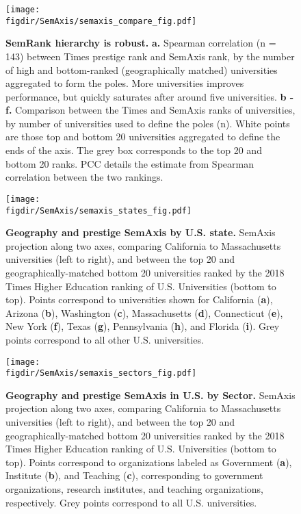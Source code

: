 \documentclass[12pt]{article} %
\def\figdir{../Figs}
\begin{document}
%
%
\begin{figure}[hp!]
	\centering
	\label{fig:supp:semaxis_compare}
	\texttt{[image: \\figdir/SemAxis/semaxis\_compare\_fig.pdf]}
	\caption{
		\textbf{SemRank hierarchy is robust.}
		\textbf{a.} Spearman correlation (n = 143) between Times prestige rank and SemAxis rank, by the number of high and bottom-ranked (geographically matched) universities aggregated to form the poles. 
		More universities improves performance, but quickly saturates after around five universities. 
		\textbf{b - f.} Comparison between the Times and SemAxis ranks of universities, by number of universities used to define the poles (n). 
		White points are those top and bottom 20 universities aggregated to define the ends of the axis. 
		The grey box corresponds to the top 20 and bottom 20 ranks. 
	  	PCC details the estimate from Spearman correlation between the two rankings. 
	}
\end{figure}


%
%
\begin{figure}[hp!]
	\centering
	\label{fig:supp:semaxis_states}
	\texttt{[image: \\figdir/SemAxis/semaxis\_states\_fig.pdf]}
	\caption{
		\textbf{Geography and prestige SemAxis by U.S. state.}
		SemAxis projection along two axes, comparing California to Massachusetts universities (left to right), and between the top 20 and geographically-matched bottom 20 universities ranked by the 2018 Times Higher Education ranking of U.S. Universities (bottom to top). 
		Points correspond to universities shown for California (\textbf{a}), Arizona (\textbf{b}), Washington (\textbf{c}), Massachusetts (\textbf{d}), Connecticut (\textbf{e}), New York (\textbf{f}), Texas (\textbf{g}), Pennsylvania (\textbf{h}), and Florida (\textbf{i}).
		Grey points correspond to all other U.S. universities. 
	}
\end{figure}


%
%
\begin{figure}[hp!]
	\centering
	\label{fig:supp:semaxis_sectors}
	\texttt{[image: \\figdir/SemAxis/semaxis\_sectors\_fig.pdf]}
	\caption{
		\textbf{Geography and prestige SemAxis in U.S. by Sector.}
		SemAxis projection along two axes, comparing California to Massachusetts universities (left to right), and between the top 20 and geographically-matched bottom 20 universities ranked by the 2018 Times Higher Education ranking of U.S. Universities (bottom to top). 
		Points correspond to organizations labeled as Government (\textbf{a}), Institute (\textbf{b}), and Teaching (\textbf{c}), corresponding to government organizations, research institutes, and teaching organizations, respectively.
		Grey points correspond to all U.S. universities.  
	}
\end{figure}




\clearpage
\printbibliography{}
    
\end{document}
